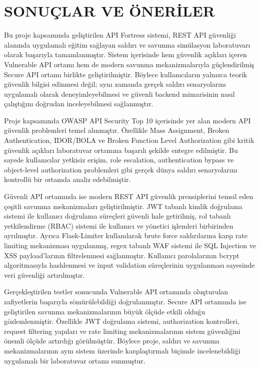 \section{SONUÇLAR VE ÖNERİLER}
\label{bolum10}

Bu proje kapsamında geliştirilen API Fortress sistemi, REST API güvenliği alanında uygulamalı eğitim sağlayan saldırı ve savunma simülasyon laboratuvarı olarak başarıyla tamamlanmıştır. Sistem içerisinde hem güvenlik açıkları içeren Vulnerable API ortamı hem de modern savunma mekanizmalarıyla güçlendirilmiş Secure API ortamı birlikte geliştirilmiştir. Böylece kullanıcıların yalnızca teorik güvenlik bilgisi edinmesi değil; aynı zamanda gerçek saldırı senaryolarını uygulamalı olarak deneyimleyebilmesi ve güvenli backend mimarisinin nasıl çalıştığını doğrudan inceleyebilmesi sağlanmıştır.

Proje kapsamında OWASP API Security Top 10 içerisinde yer alan modern API güvenlik problemleri temel alınmıştır. Özellikle Mass Assignment, Broken Authentication, IDOR/BOLA ve Broken Function Level Authorization gibi kritik güvenlik açıkları laboratuvar ortamına başarılı şekilde entegre edilmiştir. Bu sayede kullanıcılar yetkisiz erişim, role escalation, authentication bypass ve object-level authorization problemleri gibi gerçek dünya saldırı senaryolarını kontrollü bir ortamda analiz edebilmiştir.

Güvenli API ortamında ise modern REST API güvenlik prensiplerini temsil eden çeşitli savunma mekanizmaları geliştirilmiştir. JWT tabanlı kimlik doğrulama sistemi ile kullanıcı doğrulama süreçleri güvenli hale getirilmiş, rol tabanlı yetkilendirme (RBAC) sistemi ile kullanıcı ve yönetici işlemleri birbirinden ayrılmıştır. Ayrıca Flask-Limiter kullanılarak brute force saldırılarına karşı rate limiting mekanizması uygulanmış, regex tabanlı WAF sistemi ile SQL Injection ve XSS payload’larının filtrelenmesi sağlanmıştır. Kullanıcı parolalarının bcrypt algoritmasıyla hashlenmesi ve input validation süreçlerinin uygulanması sayesinde veri güvenliği artırılmıştır.

Gerçekleştirilen testler sonucunda Vulnerable API ortamında oluşturulan zafiyetlerin başarıyla sömürülebildiği doğrulanmıştır. Secure API ortamında ise geliştirilen savunma mekanizmalarının büyük ölçüde etkili olduğu gözlemlenmiştir. Özellikle JWT doğrulama sistemi, authorization kontrolleri, request filtering yapıları ve rate limiting mekanizmalarının sistem güvenliğini önemli ölçüde artırdığı görülmüştür. Böylece proje, saldırı ve savunma mekanizmalarının aynı sistem üzerinde karşılaştırmalı biçimde incelenebildiği uygulamalı bir laboratuvar ortamı sunmuştur.

